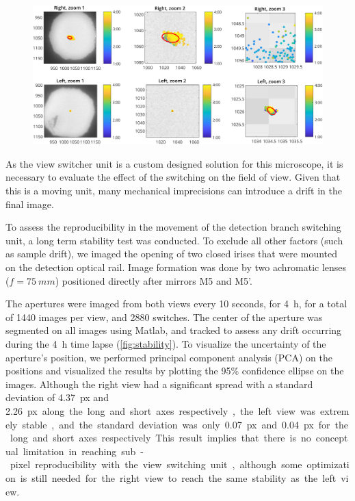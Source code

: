     \begin{figure}
      \centering
      \includegraphics[width=\textwidth]{trackCenter}
      \label{fig:stability}
    \end{figure}

    As the view switcher unit is a custom designed solution for this microscope, it is necessary to evaluate the effect of the switching on the field of view. Given that this is a moving unit, many mechanical imprecisions can introduce a drift in the final image. 

    To assess the reproducibility in the movement of the detection branch switching unit, a long term stability test was conducted. To exclude all other factors (such as sample drift), we imaged the opening of two closed irises that were mounted on the detection optical rail. Image formation was done by two achromatic lenses ($f=\SI{75}{mm}$) positioned directly after mirrors M5 and M5'.
    
    The apertures were imaged from both views every 10 seconds, for \SI{4}{h}, for a total of 1440 images per view, and 2880 switches. The center of the aperture was segmented on all images using Matlab, and tracked to assess any drift occurring during the \SI{4}{h} time lapse (\autoref{fig:stability}). To visualize the uncertainty of the aperture's position, we performed principal component analysis (PCA) on the positions and visualized the results by plotting the 95\% confidence ellipse on the images. Although the right view had a significant spread with a standard deviation of \SI{4.37}{px} and \SI{2.26}px along the long and short axes respectively, the left view was extremely stable, and the standard deviation was only \SI{0.07}{px} and \SI{0.04}{px} for the long and short axes respectively. This result implies that there is no conceptual limitation in reaching sub-pixel reproducibility with the view switching unit, although some optimization is still needed for the right view to reach the same stability as the left view. 

